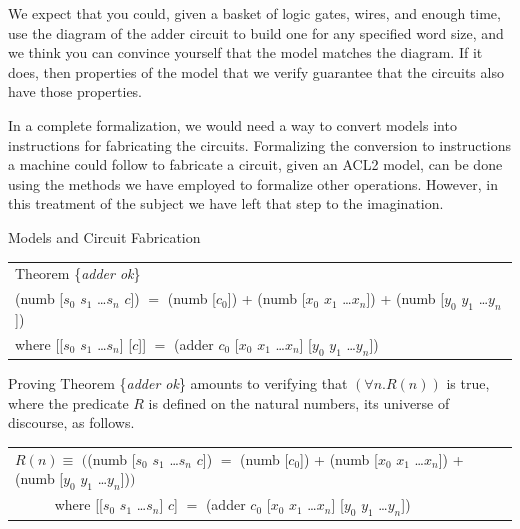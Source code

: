 \begin{aside}
We expect that you could, given a basket of
logic gates, wires, and enough time,
use the diagram of the adder circuit to
build one for any specified word size,
and we think you can convince yourself that the model
matches the diagram.
If it does, then properties of the model
that we verify guarantee that the circuits also have those properties.

In a complete formalization, we would
need a way to convert models into instructions
for fabricating the circuits.
Formalizing the conversion to instructions a machine could
follow to fabricate a circuit, given an ACL2 model,
can be done using the methods
we have employed to formalize other operations.
However, in this treatment of the subject
we have left that step to the imagination.
\caption{Models and Circuit Fabrication}
\label{circuit-vs-model}
\end{aside}

\begin{samepage}
\label{adder-thm}
\begin{center}
\begin{tabular}{l}
Theorem \{\emph{adder ok}\} \\
(numb [$s_0$ $s_1$ \dots $s_{n}$ $c$]) $=$
(numb [$c_0$]) + (numb [$x_0$ $x_1$ \dots $x_{n}$]) + (numb [$y_0$ $y_1$ \dots $y_{n}$]) \\
where [[$s_0$ $s_1$ \dots $s_{n}$] [$c$]] $=$ (adder $c_0$ [$x_0$ $x_1$ \dots $x_{n}$] [$y_0$ $y_1$ \dots $y_{n}$])\\
\end{tabular}
\end{center}
\end{samepage}

Proving Theorem \{\emph{adder ok}\} amounts to
verifying that $(\forall n.R(n))$ is true,
where the predicate $R$ is defined on the natural numbers,
its universe of discourse, as follows.
\begin{center}
\begin{tabular}{l}
$R(n) \equiv$ $($(numb [$s_0$ $s_1$ \dots $s_{n}$ $c$]) $=$
(numb [$c_0$]) + (numb [$x_0$ $x_1$ \dots $x_{n}$]) + (numb [$y_0$ $y_1$ \dots $y_{n}$])$)$ \\
~~~~~ where [[$s_0$ $s_1$ \dots $s_{n}$] $c$] $=$ (adder $c_0$ [$x_0$ $x_1$ \dots $x_{n}$] [$y_0$ $y_1$ \dots $y_{n}$])\\
\end{tabular}
\end{center}

